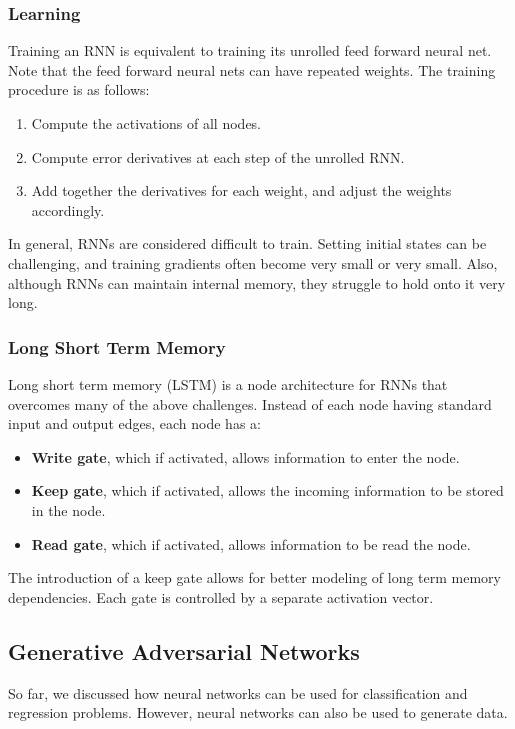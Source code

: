 \documentclass[12pt,titlepage]{article}
\begin{document}
      \subsubsection{Learning}
        Training an RNN is equivalent to training its unrolled feed forward neural net. Note that the feed forward neural nets can have repeated weights. The training procedure
        is as follows:
        \begin{enumerate}
          \item Compute the activations of all nodes.
          \item Compute error derivatives at each step of the unrolled RNN.
          \item Add together the derivatives for each weight, and adjust the weights accordingly.
        \end{enumerate}

        In general, RNNs are considered difficult to train. Setting initial states can be challenging, and training gradients often become very small or very small. Also, although
        RNNs can maintain internal memory, they struggle to hold onto it very long.

      \subsubsection{Long Short Term Memory}
        Long short term memory (LSTM) is a node architecture for RNNs that overcomes many of the above challenges. Instead of each node having standard input and output edges, each
        node has a:

        \begin{itemize}
          \item \textbf{Write gate}, which if activated, allows information to enter the node.
          \item \textbf{Keep gate}, which if activated, allows the incoming information to be stored in the node.
          \item \textbf{Read gate}, which if activated, allows information to be read the node.
        \end{itemize}

        The introduction of a keep gate allows for better modeling of long term memory dependencies. Each gate is controlled by a separate activation vector.

    \subsection{Generative Adversarial Networks}
      So far, we discussed how neural networks can be used for classification and regression problems. However, neural networks can also be used to generate data.
\end{document}
